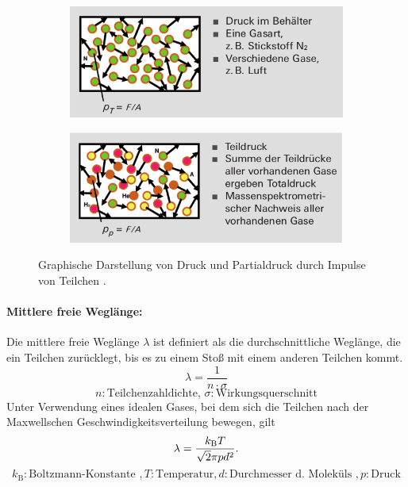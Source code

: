 \begin{figure}
  \centering
  \begin{subfigure}[b]{0.48\textwidth}
    \centering
    \includegraphics[width=\textwidth]{Druck.png}
  \end{subfigure}
  \begin{subfigure}[b]{0.49\textwidth}
    \centering
    \includegraphics[width=\textwidth]{Partialdruck.png}
  \end{subfigure}
  \caption{Graphische Darstellung von Druck und Partialdruck durch Impulse von Teilchen \cite{pfeiffer}.}
  \label{fig:Druck}
\end{figure}

\paragraph{Mittlere freie Weglänge:}
Die mittlere freie Weglänge $\lambda$ ist definiert als die durchschnittliche Weglänge, die
ein Teilchen zurücklegt, bis es zu einem Stoß mit einem anderen Teilchen kommt.
\begin{equation}
  \lambda = \frac{1}{n\cdot\sigma}
  \label{eqn:Weglaenge}
\end{equation}
\begin{equation*}
  n:\text{Teilchenzahldichte, } \sigma:\text{Wirkungsquerschnitt}
\end{equation*}
Unter Verwendung eines idealen Gases, bei dem sich die Teilchen nach der Maxwellschen Geschwindigkeitsverteilung
bewegen, gilt
\begin{equation}
  \lambda = \frac{k_\text{B}T}{\sqrt{2}\pi p d^2}. \\
\end{equation}
\begin{equation*}
  k_\text{B}:\text{Boltzmann-Konstante }, T:\text{Temperatur}, d:\text{Durchmesser d. Moleküls }, p:\text{Druck}
\end{equation*}
